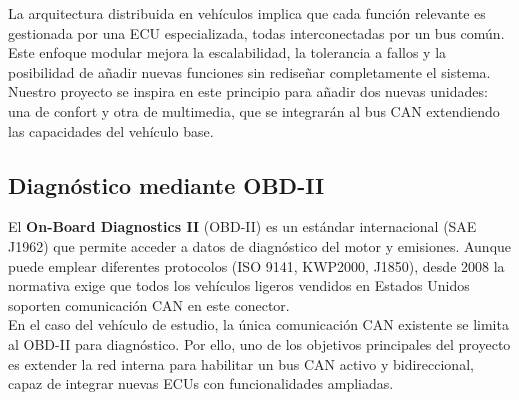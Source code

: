 La arquitectura distribuida en vehículos implica que cada función relevante es gestionada por una ECU especializada, todas interconectadas por un bus común. Este enfoque modular mejora la escalabilidad, la tolerancia a fallos y la posibilidad de añadir nuevas funciones sin rediseñar completamente el sistema.\\

Nuestro proyecto se inspira en este principio para añadir dos nuevas unidades: una de confort y otra de multimedia, que se integrarán al bus CAN extendiendo las capacidades del vehículo base.

\subsection{Diagnóstico mediante OBD-II}

El \textbf{On-Board Diagnostics II} (OBD-II) es un estándar internacional (SAE J1962) que permite acceder a datos de diagnóstico del motor y emisiones. Aunque puede emplear diferentes protocolos (ISO 9141, KWP2000, J1850), desde 2008 la normativa exige que todos los vehículos ligeros vendidos en Estados Unidos soporten comunicación CAN en este conector.\\

En el caso del vehículo de estudio, la única comunicación CAN existente se limita al OBD-II para diagnóstico. Por ello, uno de los objetivos principales del proyecto es extender la red interna para habilitar un bus CAN activo y bidireccional, capaz de integrar nuevas ECUs con funcionalidades ampliadas.
